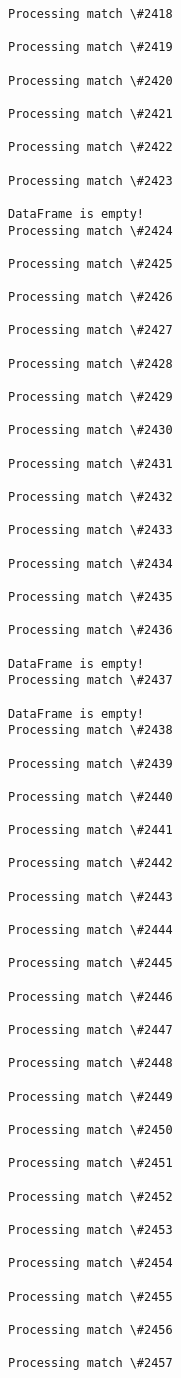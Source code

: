 \documentclass[11pt]{article}
\begin{document}
\begin{Verbatim}[commandchars=\\\{\}]
Processing match \#2418

Processing match \#2419

Processing match \#2420

Processing match \#2421

Processing match \#2422

Processing match \#2423

DataFrame is empty!
Processing match \#2424

Processing match \#2425

Processing match \#2426

Processing match \#2427

Processing match \#2428

Processing match \#2429

Processing match \#2430

Processing match \#2431

Processing match \#2432

Processing match \#2433

Processing match \#2434

Processing match \#2435

Processing match \#2436

DataFrame is empty!
Processing match \#2437

DataFrame is empty!
Processing match \#2438

Processing match \#2439

Processing match \#2440

Processing match \#2441

Processing match \#2442

Processing match \#2443

Processing match \#2444

Processing match \#2445

Processing match \#2446

Processing match \#2447

Processing match \#2448

Processing match \#2449

Processing match \#2450

Processing match \#2451

Processing match \#2452

Processing match \#2453

Processing match \#2454

Processing match \#2455

Processing match \#2456

Processing match \#2457


\end{Verbatim}
\end{document}
